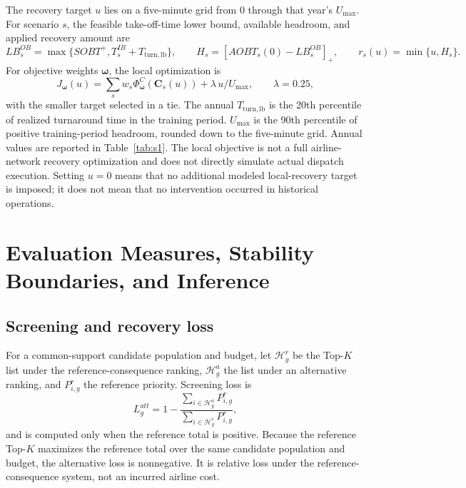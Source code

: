 \documentclass[10pt,a4paper]{article}
\numberwithin{equation}{section}
\begin{document}
The recovery target $u$ lies on a five-minute grid from 0 through that year's $U_{\max}$. For scenario $s$, the feasible take-off-time lower bound, available headroom, and applied recovery amount are
\begin{equation}
LB^{OB}_s=\max\{SOBT^+,T^{IB}_s+T_{\mathrm{turn,lb}}\},\qquad
H_s=[AOBT_s(0)-LB^{OB}_s]_+,\qquad
r_s(u)=\min\{u,H_s\}.
\label{eq:headroom}
\end{equation}
For objective weights $\boldsymbol\omega$, the local optimization is
\begin{equation}
J_{\boldsymbol\omega}(u)
=\sum_s w_s\Phi^C_{\boldsymbol\omega}(\mathbf C_s(u))
+\lambda\,u/U_{\max},\qquad \lambda=0.25,
\label{eq:objective}
\end{equation}
with the smaller target selected in a tie. The annual $T_{\mathrm{turn,lb}}$ is the 20th percentile of realized turnaround time in the training period. $U_{\max}$ is the 90th percentile of positive training-period headroom, rounded down to the five-minute grid. Annual values are reported in Table~\ref{tab:s1}. The local objective is not a full airline-network recovery optimization and does not directly simulate actual dispatch execution. Setting $u=0$ means that no additional modeled local-recovery target is imposed; it does not mean that no intervention occurred in historical operations.

\section{Evaluation Measures, Stability Boundaries, and Inference}
\label{sup:inference}

\subsection{Screening and recovery loss}
For a common-support candidate population and budget, let $\mathcal H^r_g$ be the Top-$K$ list under the reference-consequence ranking, $\mathcal H^a_g$ the list under an alternative ranking, and $P^r_{i,g}$ the reference priority. Screening loss is
\begin{equation}
L^{att}_g=1-\frac{\sum_{i\in\mathcal H^a_g}P^r_{i,g}}{\sum_{i\in\mathcal H^r_g}P^r_{i,g}},
\label{eq:latt}
\end{equation}
and is computed only when the reference total is positive. Because the reference Top-$K$ maximizes the reference total over the same candidate population and budget, the alternative loss is nonnegative. It is relative loss under the reference-consequence system, not an incurred airline cost.
\end{document}
